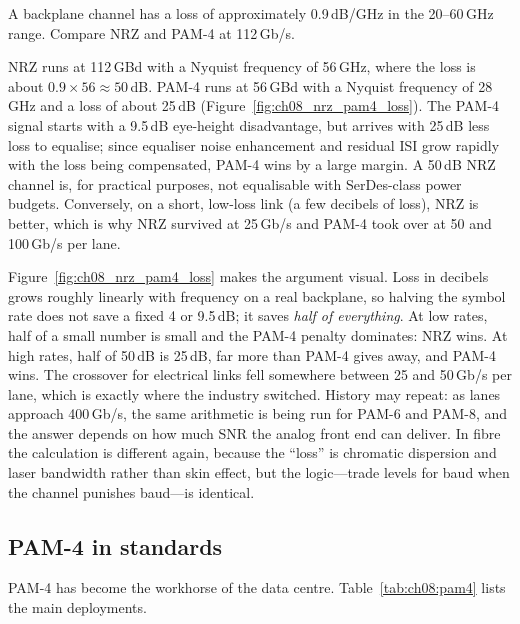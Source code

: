 \begin{worked}
A backplane channel has a loss of approximately 0.9\,dB/GHz in the 20--60\,GHz range. Compare NRZ
and PAM-4 at 112\,Gb/s.

NRZ runs at 112\,GBd with a Nyquist frequency of 56\,GHz, where the loss is about
$0.9\times56\approx50$\,dB. PAM-4 runs at 56\,GBd with a Nyquist frequency of 28\,GHz and a loss of
about 25\,dB (Figure~\ref{fig:ch08_nrz_pam4_loss}). The PAM-4 signal starts with a 9.5\,dB
eye-height disadvantage, but arrives with 25\,dB less loss to equalise; since equaliser noise
enhancement and residual ISI grow rapidly with the loss being compensated, PAM-4 wins by a
large margin. A 50\,dB NRZ channel is, for practical purposes, not equalisable with
SerDes-class power budgets. Conversely, on a short, low-loss link (a few decibels of loss), NRZ
is better, which is why NRZ survived at 25\,Gb/s and PAM-4 took over at 50 and 100\,Gb/s per
lane.
\end{worked}

Figure~\ref{fig:ch08_nrz_pam4_loss} makes the argument visual. Loss in decibels grows roughly
linearly with frequency on a real backplane, so halving the symbol rate does not save a fixed
4 or 9.5\,dB; it saves \emph{half of everything}. At low rates, half of a small number is small
and the PAM-4 penalty dominates: NRZ wins. At high rates, half of 50\,dB is 25\,dB, far more
than PAM-4 gives away, and PAM-4 wins. The crossover for electrical links fell somewhere
between 25 and 50\,Gb/s per lane, which is exactly where the industry switched. History may
repeat: as lanes approach 400\,Gb/s, the same arithmetic is being run for PAM-6 and PAM-8,
and the answer depends on how much SNR the analog front end can deliver. In fibre the
calculation is different again, because the ``loss'' is chromatic dispersion and laser
bandwidth rather than skin effect, but the logic---trade levels for baud when the channel
punishes baud---is identical.


\subsection{PAM-4 in standards}

PAM-4 has become the workhorse of the data centre. Table~\ref{tab:ch08:pam4} lists the main
deployments.

